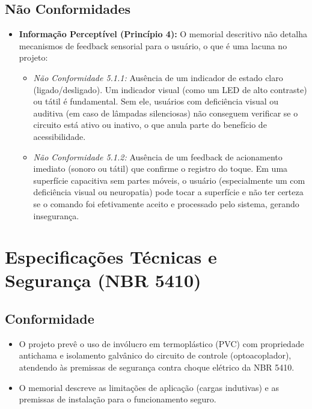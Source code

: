 \documentclass[12pt, openright, a4paper, openany, oneside, chapter=TITLE, section=TITLE, subsection=TITLE, subsubsection=TITLE, subsubsubsection=TITLE, subsubsubsection=TITLE, brazil]{abntex2}
\begin{document}
\subsection{Não Conformidades}
\begin{itemize}
    \item \textbf{Informação Perceptível (Princípio 4):} O memorial descritivo não detalha mecanismos de feedback sensorial para o usuário, o que é uma lacuna no projeto:
        \begin{itemize}
            \item \textit{Não Conformidade 5.1.1:} Ausência de um indicador de estado claro (ligado/desligado). Um indicador visual (como um LED de alto contraste) ou tátil é fundamental. Sem ele, usuários com deficiência visual ou auditiva (em caso de lâmpadas silenciosas) não conseguem verificar se o circuito está ativo ou inativo, o que anula parte do benefício de acessibilidade.
            \item \textit{Não Conformidade 5.1.2:} Ausência de um feedback de acionamento imediato (sonoro ou tátil) que confirme o registro do toque. Em uma superfície capacitiva sem partes móveis, o usuário (especialmente um com deficiência visual ou neuropatia) pode tocar a superfície e não ter certeza se o comando foi efetivamente aceito e processado pelo sistema, gerando insegurança.
        \end{itemize}
\end{itemize}

\section{Especificações Técnicas e Segurança (NBR 5410)}

\subsection{Conformidade}
\begin{itemize}
    \item O projeto prevê o uso de invólucro em termoplástico (PVC) com propriedade antichama e isolamento galvânico do circuito de controle (optoacoplador), atendendo às premissas de segurança contra choque elétrico da NBR 5410.
    \item O memorial descreve as limitações de aplicação (cargas indutivas) e as premissas de instalação para o funcionamento seguro.
\end{itemize}
\end{document}
